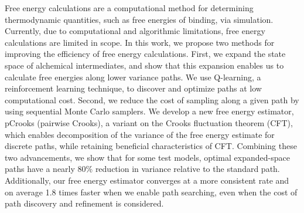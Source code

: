 \abstract

Free energy calculations are a computational method for determining thermodynamic quantities, such as free energies of binding, via simulation. 
Currently, due to computational and algorithmic limitations, free energy calculations are limited in scope.
In this work, we propose two methods for improving the efficiency of free energy calculations.
First, we expand the state space of alchemical intermediates, and show that this expansion enables us to calculate free energies along lower variance paths.
We use Q-learning, a reinforcement learning technique, to discover and optimize paths at low computational cost.
Second, we reduce the cost of sampling along a given path by using sequential Monte Carlo samplers.
We develop a new free energy estimator, pCrooks (pairwise Crooks), a variant on the Crooks fluctuation theorem (CFT), which enables decomposition of the variance of the free energy estimate for discrete paths, while retaining beneficial characteristics of CFT.
Combining these two advancements, we show that for some test models, optimal expanded-space paths have a nearly 80\% reduction in variance relative to the standard path.
Additionally, our free energy estimator converges at a more consistent rate and on average 1.8 times faster when we enable path searching, even when the cost of path discovery and refinement is considered.

